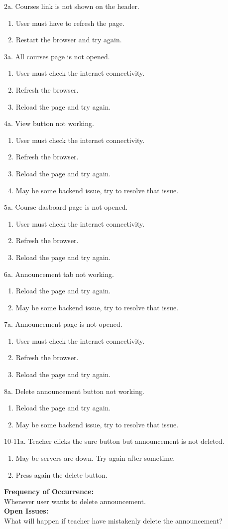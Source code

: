 \documentclass[12pt]{article}
\begin{document}
\newpage
2a. Courses link is not shown on the header.
\begin{enumerate}
\item User must have to refresh the page.
\item Restart the browser and try again.
\end{enumerate} 
3a. All courses page is not opened.
\begin{enumerate}
\item User must check the internet connectivity.
\item Refresh the browser.
\item Reload the page and try again.
\end{enumerate}
4a. View button not working.
\begin{enumerate}
\item User must check the internet connectivity.
\item Refresh the browser.
\item Reload the page and try again.
\item May be some backend issue, try to resolve that issue.
\end{enumerate}
5a. Course dasboard page is not opened.
\begin{enumerate}
\item User must check the internet connectivity.
\item Refresh the browser.
\item Reload the page and try again.
\end{enumerate}
6a. Announcement tab not working.
\begin{enumerate}
\item Reload the page and try again.
\item May be some backend issue, try to resolve that issue.
\end{enumerate}
\newpage
7a. Announcement page is not opened.
\begin{enumerate}
\item User must check the internet connectivity.
\item Refresh the browser.
\item Reload the page and try again.
\end{enumerate}
8a. Delete announcement button not working.
\begin{enumerate}
\item Reload the page and try again.
\item May be some backend issue, try to resolve that issue.
\end{enumerate}
10-11a. Teacher clicks the sure button but announcement is not deleted.
\begin{enumerate}
\item May be servers are down. Try again after sometime.
\item Press again the delete button.
\end{enumerate}
\textbf{Frequency of Occurrence:}\\
Whenever user wants to delete announcement.\\
\textbf{Open Issues:}\\
What will happen if teacher have mistakenly delete the announcement?
\end{document}
